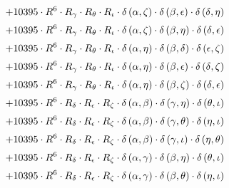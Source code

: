 \begin{subequations}
\begin{gather}
 \\[0.2em] \notag 		 + 10395 \cdot R^{6} \cdot R_{\gamma{}} \cdot R_{\theta{}} \cdot R_{\iota{}} \cdot \delta{}\left(\alpha{}, \zeta{}\right) \cdot \delta{}\left(\beta{}, \epsilon{}\right) \cdot \delta{}\left(\delta{}, \eta{}\right) 
 \\[0.2em] \notag 		 + 10395 \cdot R^{6} \cdot R_{\gamma{}} \cdot R_{\theta{}} \cdot R_{\iota{}} \cdot \delta{}\left(\alpha{}, \zeta{}\right) \cdot \delta{}\left(\beta{}, \eta{}\right) \cdot \delta{}\left(\delta{}, \epsilon{}\right) 
 \\[0.2em] \notag 		 + 10395 \cdot R^{6} \cdot R_{\gamma{}} \cdot R_{\theta{}} \cdot R_{\iota{}} \cdot \delta{}\left(\alpha{}, \eta{}\right) \cdot \delta{}\left(\beta{}, \delta{}\right) \cdot \delta{}\left(\epsilon{}, \zeta{}\right) 
 \\[0.2em] \notag 		 + 10395 \cdot R^{6} \cdot R_{\gamma{}} \cdot R_{\theta{}} \cdot R_{\iota{}} \cdot \delta{}\left(\alpha{}, \eta{}\right) \cdot \delta{}\left(\beta{}, \epsilon{}\right) \cdot \delta{}\left(\delta{}, \zeta{}\right) 
 \\[0.2em] \notag 		 + 10395 \cdot R^{6} \cdot R_{\gamma{}} \cdot R_{\theta{}} \cdot R_{\iota{}} \cdot \delta{}\left(\alpha{}, \eta{}\right) \cdot \delta{}\left(\beta{}, \zeta{}\right) \cdot \delta{}\left(\delta{}, \epsilon{}\right) 
 \\[0.2em] \notag 		 + 10395 \cdot R^{6} \cdot R_{\delta{}} \cdot R_{\epsilon{}} \cdot R_{\zeta{}} \cdot \delta{}\left(\alpha{}, \beta{}\right) \cdot \delta{}\left(\gamma{}, \eta{}\right) \cdot \delta{}\left(\theta{}, \iota{}\right) 
 \\[0.2em] \notag 		 + 10395 \cdot R^{6} \cdot R_{\delta{}} \cdot R_{\epsilon{}} \cdot R_{\zeta{}} \cdot \delta{}\left(\alpha{}, \beta{}\right) \cdot \delta{}\left(\gamma{}, \theta{}\right) \cdot \delta{}\left(\eta{}, \iota{}\right) 
 \\[0.2em] \notag 		 + 10395 \cdot R^{6} \cdot R_{\delta{}} \cdot R_{\epsilon{}} \cdot R_{\zeta{}} \cdot \delta{}\left(\alpha{}, \beta{}\right) \cdot \delta{}\left(\gamma{}, \iota{}\right) \cdot \delta{}\left(\eta{}, \theta{}\right) 
 \\[0.2em] \notag 		 + 10395 \cdot R^{6} \cdot R_{\delta{}} \cdot R_{\epsilon{}} \cdot R_{\zeta{}} \cdot \delta{}\left(\alpha{}, \gamma{}\right) \cdot \delta{}\left(\beta{}, \eta{}\right) \cdot \delta{}\left(\theta{}, \iota{}\right) 
 \\[0.2em] \notag 		 + 10395 \cdot R^{6} \cdot R_{\delta{}} \cdot R_{\epsilon{}} \cdot R_{\zeta{}} \cdot \delta{}\left(\alpha{}, \gamma{}\right) \cdot \delta{}\left(\beta{}, \theta{}\right) \cdot \delta{}\left(\eta{}, \iota{}\right) 

\end{gather}
\end{subequations}
